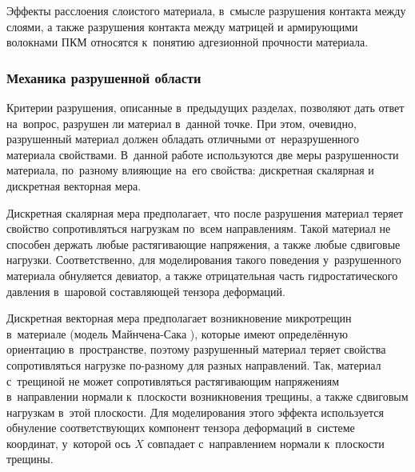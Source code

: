 \documentclass[thesis.tex]{subfiles}
\begin{document}
Эффекты расслоения слоистого материала, в~смысле разрушения контакта между слоями, а также разрушения контакта между
матрицей и армирующими волокнами ПКМ относятся к~понятию адгезионной прочности материала.

\subsubsection{Механика разрушенной области}
Критерии разрушения, описанные в~предыдущих разделах, позволяют дать ответ на~вопрос, разрушен ли материал в~данной
точке. При этом, очевидно, разрушенный материал должен обладать отличными от~неразрушенного материала свойствами. В~данной
работе используются две меры разрушенности материала, по~разному влияющие на~его свойства: дискретная скалярная и
дискретная векторная мера.

Дискретная скалярная мера предполагает, что после разрушения материал теряет свойство сопротивляться нагрузкам по~всем
направлениям. Такой материал не способен держать любые растягивающие напряжения, а также любые сдвиговые нагрузки.
Соответственно, для моделирования такого поведения у~разрушенного материала обнуляется девиатор, а также отрицательная
часть гидростатического давления в~шаровой составляющей тензора деформаций.

Дискретная векторная мера предполагает возникновение микротрещин в~материале (модель Майнчена-Сака
\cite{олдер1967вычислительные}), которые имеют определённую ориентацию в~пространстве, поэтому разрушенный материал
теряет свойства сопротивляться нагрузке по-разному для разных направлений. Так, материал с~трещиной не может
сопротивляться растягивающим напряжениям в~направлении нормали к~плоскости возникновения трещины, а также сдвиговым
нагрузкам в~этой плоскости. Для моделирования этого эффекта используется обнуление соответствующих компонент тензора
деформаций в~системе координат, у~которой ось $X$ совпадает с~направлением нормали к~плоскости трещины.
\end{document}
